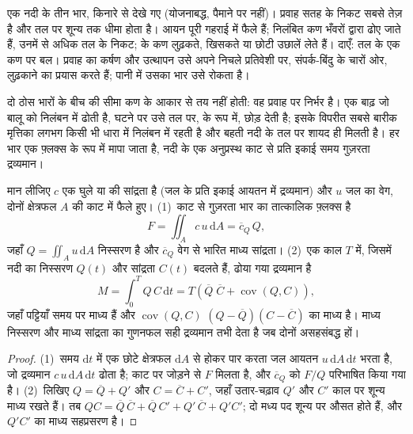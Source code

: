 \begin{omfigure}
{\small एक नदी के तीन भार, किनारे से देखे गए (योजनाबद्ध, पैमाने पर नहीं)। प्रवाह सतह के निकट सबसे तेज़ है और तल पर शून्य तक धीमा होता है। आयन पूरी गहराई में फैले हैं; निलंबित कण भँवरों द्वारा ढोए जाते हैं, उनमें से अधिक तल के निकट;  के कण लुढ़कते, खिसकते या छोटी उछालें लेते हैं। दाएँ: तल के एक कण पर बल। प्रवाह का कर्षण और उत्थापन उसे अपने निचले प्रतिवेशी पर, संपर्क-बिंदु के चारों ओर, लुढ़काने का प्रयास करते हैं; पानी में उसका भार उसे रोकता है।}
\label{fig:b1:erosion-transport:loads}
\end{omfigure}

दो ठोस भारों के बीच की सीमा कण के आकार से तय नहीं होती: वह प्रवाह पर निर्भर है। एक बाढ़ जो बालू को निलंबन में ढोती है, घटने पर उसे तल पर,  के रूप में, छोड़ देती है; इसके विपरीत सबसे बारीक मृत्तिका लगभग किसी भी धारा में निलंबन में रहती है और बहती नदी के तल पर शायद ही मिलती है। हर भार एक फ़्लक्स के रूप में मापा जाता है, नदी के एक अनुप्रस्थ काट से प्रति इकाई समय गुज़रता द्रव्यमान।

\begin{proposition}[एक भार का फ़्लक्स]\label{prop:b1:erosion-transport:flux}
मान लीजिए $c$ एक घुले या  की सांद्रता है (जल के प्रति इकाई आयतन में द्रव्यमान) और $u$ जल का वेग, दोनों क्षेत्रफल $A$ की काट में फैले हुए। (1)~काट से गुज़रता भार का तात्कालिक फ़्लक्स है
\[
  F = \iint_A c\,u\,\mathrm dA = \overline{c}_Q\,Q,
\]
जहाँ $Q = \iint_A u\,\mathrm dA$ निस्सरण है और $\overline{c}_Q$ वेग से भारित माध्य सांद्रता। (2)~एक काल $T$ में, जिसमें नदी का निस्सरण $Q(t)$ और सांद्रता $C(t)$ बदलते हैं, ढोया गया द्रव्यमान है
\[
  M = \int_0^T Q\,C\,\mathrm dt = T\left(\overline{Q}\;\overline{C} +
  \operatorname{cov}(Q, C)\right),
\]
जहाँ पट्टियाँ समय पर माध्य हैं और $\operatorname{cov}(Q, C)$ $(Q - \overline{Q})(C - \overline{C})$ का माध्य है। माध्य निस्सरण और माध्य सांद्रता का गुणनफल सही द्रव्यमान तभी देता है जब दोनों असहसंबद्ध हों।
\end{proposition}

\begin{proof}
(1)~समय $\mathrm dt$ में एक छोटे क्षेत्रफल $\mathrm dA$ से होकर पार करता जल आयतन $u\,\mathrm dA\,\mathrm dt$ भरता है, जो द्रव्यमान $c\,u\,\mathrm dA\,\mathrm dt$ ढोता है; काट पर जोड़ने से $F$ मिलता है, और $\overline{c}_Q$ को $F/Q$ परिभाषित किया गया है। (2)~लिखिए $Q = \overline{Q} + Q'$ और $C =
\overline{C} + C'$, जहाँ उतार-चढ़ाव $Q'$ और $C'$ काल पर शून्य माध्य रखते हैं। तब $QC = \overline{Q}\,\overline{C} + \overline{Q}\,C' + Q'\,\overline{C}
+ Q'C'$; दो मध्य पद शून्य पर औसत होते हैं, और $Q'C'$ का माध्य सहप्रसरण है।
\end{proof}

